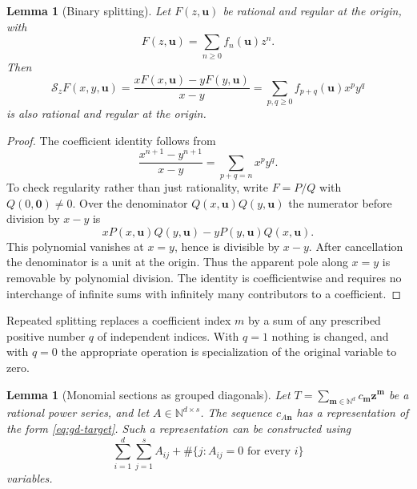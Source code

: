\documentclass[11pt,a4paper]{article}
\newtheorem{lemma}[theorem]{Lemma}
\theoremstyle{remark}\newtheorem{remark}[theorem]{Remark}
\begin{document}
\begin{lemma}[Binary splitting]
\label{lem:gd-split}
Let $F(z,\boldsymbol u)$ be rational and regular at the origin, with
\[
 F(z,\boldsymbol u)=\sum_{n\ge0}f_n(\boldsymbol u)z^n.
\]
Then
\begin{equation}
 \mathcal S_zF(x,y,\boldsymbol u)
 =\frac{xF(x,\boldsymbol u)-yF(y,\boldsymbol u)}{x-y}
 =\sum_{p,q\ge0}f_{p+q}(\boldsymbol u)x^py^q
 \label{eq:gd-split}
\end{equation}
is also rational and regular at the origin.
\end{lemma}

\begin{proof}
The coefficient identity follows from
\[
 \frac{x^{n+1}-y^{n+1}}{x-y}
 =\sum_{p+q=n}x^py^q.
\]
To check regularity rather than just rationality, write $F=P/Q$ with
$Q(0,\boldsymbol0)\ne0$.  Over the denominator
$Q(x,\boldsymbol u)Q(y,\boldsymbol u)$ the numerator before division
by $x-y$ is
\[
 xP(x,\boldsymbol u)Q(y,\boldsymbol u)
 -yP(y,\boldsymbol u)Q(x,\boldsymbol u).
\]
This polynomial vanishes at $x=y$, hence is divisible by $x-y$.
After cancellation the denominator is a unit at the origin.  Thus the
apparent pole along $x=y$ is removable by polynomial division.
The identity is coefficientwise and requires no interchange of
infinite sums with infinitely many contributors to a coefficient.
\end{proof}

Repeated splitting replaces a coefficient index $m$ by a sum of any
prescribed positive number $q$ of independent indices.  With $q=1$
nothing is changed, and with $q=0$ the appropriate operation is
specialization of the original variable to zero.

\begin{lemma}[Monomial sections as grouped diagonals]
\label{lem:gd-section}
Let $T=\sum_{\boldsymbol m\in\mathbb N^d}
c_{\boldsymbol m}\boldsymbol z^{\boldsymbol m}$ be a rational power
series, and let $A\in\mathbb N^{d\times s}$.  The sequence
$c_{A\boldsymbol n}$ has a representation of the form
\eqref{eq:gd-target}.  Such a representation can be constructed using
\[
 \sum_{i=1}^d\sum_{j=1}^s A_{ij}
 +\#\{j:A_{ij}=0\text{ for every }i\}
\]
variables.
\end{lemma}
\end{document}
